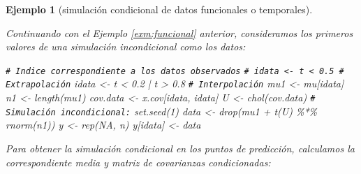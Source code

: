\documentclass[
]{book}
\newenvironment{Shaded}{\begin{snugshade}}{\end{snugshade}}
\newcommand{\CommentTok}[1]{\textcolor[rgb]{0.56,0.35,0.01}{\textit{#1}}}
\newcommand{\ConstantTok}[1]{\textcolor[rgb]{0.00,0.00,0.00}{#1}}
\newcommand{\DecValTok}[1]{\textcolor[rgb]{0.00,0.00,0.81}{#1}}
\newcommand{\FloatTok}[1]{\textcolor[rgb]{0.00,0.00,0.81}{#1}}
\newcommand{\FunctionTok}[1]{\textcolor[rgb]{0.00,0.00,0.00}{#1}}
\newcommand{\NormalTok}[1]{#1}
\newcommand{\OtherTok}[1]{\textcolor[rgb]{0.56,0.35,0.01}{#1}}
\newcommand{\SpecialCharTok}[1]{\textcolor[rgb]{0.00,0.00,0.00}{#1}}
\theoremstyle{break}
\newtheorem{example}{Ejemplo}[chapter]
\theoremstyle{nonumberplain}
\renewcommand{\CommentTok}[1]{\textcolor[rgb]{0.41,0.41,0.41}{\texttt{#1}}}
\begin{document}
\begin{example}[simulación condicional de datos funcionales o temporales]
\protect\hypertarget{exm:funcionalcond}{}\label{exm:funcionalcond}

Continuando con el Ejemplo \ref{exm:funcional} anterior, consideramos los primeros
valores de una simulación incondicional como los datos:

\begin{Shaded}
\begin{Highlighting}[]
\CommentTok{\# Indice correspondiente a los datos observados}
\CommentTok{\# idata \textless{}{-} t \textless{} 0.5 \# Extrapolación}
\NormalTok{idata }\OtherTok{\textless{}{-}}\NormalTok{ t }\SpecialCharTok{\textless{}} \FloatTok{0.2} \SpecialCharTok{|}\NormalTok{ t }\SpecialCharTok{\textgreater{}} \FloatTok{0.8} \CommentTok{\# Interpolación}
\NormalTok{mu1 }\OtherTok{\textless{}{-}}\NormalTok{ mu[idata]}
\NormalTok{n1 }\OtherTok{\textless{}{-}} \FunctionTok{length}\NormalTok{(mu1)}
\NormalTok{cov.data }\OtherTok{\textless{}{-}}\NormalTok{ x.cov[idata, idata]}
\NormalTok{U }\OtherTok{\textless{}{-}} \FunctionTok{chol}\NormalTok{(cov.data)}
\CommentTok{\# Simulación incondicional:}
\FunctionTok{set.seed}\NormalTok{(}\DecValTok{1}\NormalTok{)}
\NormalTok{data }\OtherTok{\textless{}{-}} \FunctionTok{drop}\NormalTok{(mu1 }\SpecialCharTok{+} \FunctionTok{t}\NormalTok{(U) }\SpecialCharTok{\%*\%} \FunctionTok{rnorm}\NormalTok{(n1))}
\NormalTok{y }\OtherTok{\textless{}{-}} \FunctionTok{rep}\NormalTok{(}\ConstantTok{NA}\NormalTok{, n)}
\NormalTok{y[idata] }\OtherTok{\textless{}{-}}\NormalTok{ data}
\end{Highlighting}
\end{Shaded}

Para obtener la simulación condicional en los puntos de predicción, calculamos la correspondiente media y matriz de covarianzas condicionadas:


\end{example}
\end{document}
